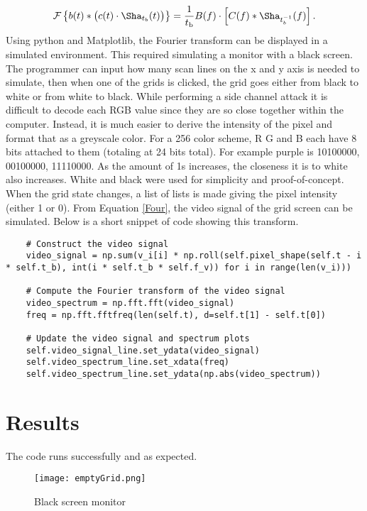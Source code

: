 \documentclass{article}
\begin{document}
\begin{equation} 
\mathcal{F} \left\{ b(t) \ast \big( c(t) \cdot \Sha_{t_{b}} (t) \big) \right\} = \\
\frac{1}{t_\text{b}} B(f) \cdot  \left[ C(f) \ast 
\Sha_{t_{b}^{-1}}(f) 
\right] .
\label{Four}
\end{equation}
 Using python and Matplotlib, the Fourier transform can be displayed in a simulated environment. This required simulating a monitor with a black screen. The programmer can input how many scan lines on the x and y axis is needed to simulate, then when one of the grids is clicked, the grid goes either from black to white or from white to black. While performing a side channel attack it is difficult to decode each RGB value since they are so close together within the computer. Instead, it is much easier to derive the intensity of the pixel and format that as a greyscale color. For a 256 color scheme, R G and B each have 8 bits attached to them (totaling at 24 bits total). For example purple is 10100000, 00100000, 11110000. As the amount of 1s increases, the closeness it is to white also increases. White and black were used for simplicity and proof-of-concept. When the grid state changes, a list of lists is made giving the pixel intensity (either 1 or 0). From Equation \ref{Four}, the video signal of the grid screen can be simulated. Below is a short snippet of code showing this transform. 
\begin{lstlisting}
    # Construct the video signal
    video_signal = np.sum(v_i[i] * np.roll(self.pixel_shape(self.t - i * self.t_b), int(i * self.t_b * self.f_v)) for i in range(len(v_i)))

    # Compute the Fourier transform of the video signal
    video_spectrum = np.fft.fft(video_signal)
    freq = np.fft.fftfreq(len(self.t), d=self.t[1] - self.t[0])

    # Update the video signal and spectrum plots
    self.video_signal_line.set_ydata(video_signal)
    self.video_spectrum_line.set_xdata(freq)
    self.video_spectrum_line.set_ydata(np.abs(video_spectrum))       
\end{lstlisting}
\section{Results}
The code runs successfully and as expected. 

\begin{figure}[h]
\centering
\texttt{[image: emptyGrid.png]}
\caption{\label{fig:emptyGrid}Black screen monitor }
\end{figure}
\end{document}
